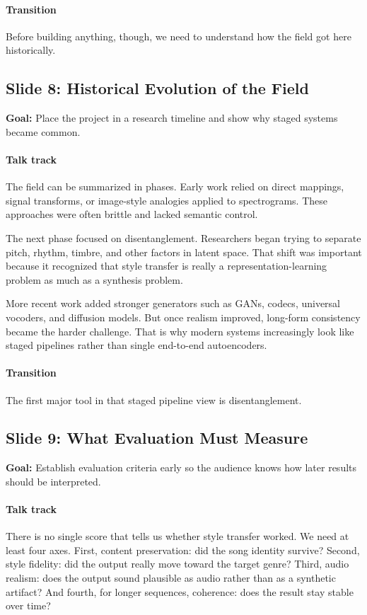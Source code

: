 \documentclass[11pt]{article}
\begin{document}
\paragraph{Transition}
Before building anything, though, we need to understand how the field got here historically.

\subsection*{Slide 8: Historical Evolution of the Field}
\textbf{Goal:} Place the project in a research timeline and show why staged systems became common.
\paragraph{Talk track}
The field can be summarized in phases. Early work relied on direct mappings, signal transforms, or image-style analogies applied to spectrograms. These approaches were often brittle and lacked semantic control.

The next phase focused on disentanglement. Researchers began trying to separate pitch, rhythm, timbre, and other factors in latent space. That shift was important because it recognized that style transfer is really a representation-learning problem as much as a synthesis problem.

More recent work added stronger generators such as GANs, codecs, universal vocoders, and diffusion models. But once realism improved, long-form consistency became the harder challenge. That is why modern systems increasingly look like staged pipelines rather than single end-to-end autoencoders.

\paragraph{Transition}
The first major tool in that staged pipeline view is disentanglement.

\subsection*{Slide 9: What Evaluation Must Measure}
\textbf{Goal:} Establish evaluation criteria early so the audience knows how later results should be interpreted.
\paragraph{Talk track}
There is no single score that tells us whether style transfer worked. We need at least four axes. First, content preservation: did the song identity survive? Second, style fidelity: did the output really move toward the target genre? Third, audio realism: does the output sound plausible as audio rather than as a synthetic artifact? And fourth, for longer sequences, coherence: does the result stay stable over time?
\end{document}
